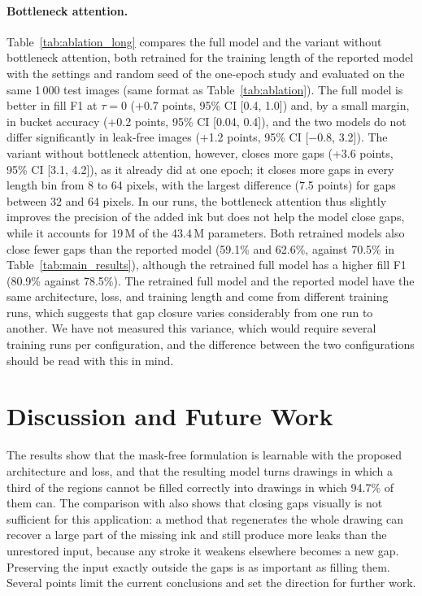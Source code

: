 \documentclass[11pt]{article}
\begin{document}
\paragraph{Bottleneck attention.} Table~\ref{tab:ablation_long} compares the full
model and the variant without bottleneck attention, both retrained for the training
length of the reported model with the settings and random seed of the one-epoch study
and evaluated on the same 1\,000 test images (same format as
Table~\ref{tab:ablation}). The full model is better in fill F1 at $\tau=0$ (+0.7
points, 95\% CI [0.4, 1.0]) and, by a small margin, in bucket accuracy (+0.2 points,
95\% CI [0.04, 0.4]), and the two models do not differ significantly in leak-free
images (+1.2 points, 95\% CI [$-0.8$, 3.2]). The variant without bottleneck attention,
however, closes more gaps (+3.6 points, 95\% CI [3.1, 4.2]), as it already did at one
epoch; it closes more gaps in every length bin from 8 to 64 pixels, with the largest
difference (7.5 points) for gaps between 32 and 64 pixels. In our runs, the bottleneck
attention thus slightly improves the precision of the added ink but does not help the
model close gaps, while it accounts for 19\,M of the 43.4\,M parameters. Both retrained models also close fewer gaps than the reported model
(59.1\% and 62.6\%, against 70.5\% in Table~\ref{tab:main_results}), although the retrained full model has a higher
fill F1 (80.9\% against 78.5\%). The retrained full model and the reported model have
the same architecture, loss, and training length and come from different training
runs, which suggests that gap closure varies considerably from one run to another. We
have not measured this variance, which would require several training runs per
configuration, and the difference between the two configurations should be read with
this in mind.

\section{Discussion and Future Work}
\label{sec:discussion}

The results show that the mask-free formulation is learnable with the proposed
architecture and loss, and that the resulting model turns drawings in which a third
of the regions cannot be filled correctly into drawings in which 94.7\% of them can.
The comparison with \citet{sasaki2017joint} also shows that closing gaps visually is
not sufficient for this application: a method that regenerates the whole drawing can
recover a large part of the missing ink and still produce more leaks than the
unrestored input, because any stroke it weakens elsewhere becomes a new gap.
Preserving the input exactly outside the gaps is as important as filling them.
Several points limit the current conclusions and set the direction for further work.
\end{document}
